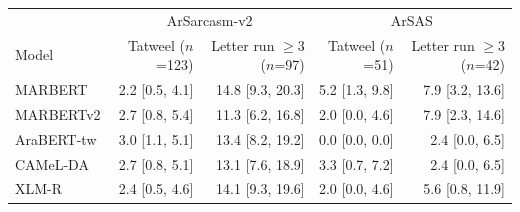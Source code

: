 \begin{tabular}{lrrrr}
\toprule
 & \multicolumn{2}{c}{ArSarcasm-v2} & \multicolumn{2}{c}{ArSAS} \\
Model & Tatweel {\scriptsize($n$=123)} & Letter run $\geq$3 {\scriptsize($n$=97)} & Tatweel {\scriptsize($n$=51)} & Letter run $\geq$3 {\scriptsize($n$=42)} \\
\midrule
MARBERT & 2.2 {\scriptsize[0.5, 4.1]} & 14.8 {\scriptsize[9.3, 20.3]} & 5.2 {\scriptsize[1.3, 9.8]} & 7.9 {\scriptsize[3.2, 13.6]} \\
MARBERTv2 & 2.7 {\scriptsize[0.8, 5.4]} & 11.3 {\scriptsize[6.2, 16.8]} & 2.0 {\scriptsize[0.0, 4.6]} & 7.9 {\scriptsize[2.3, 14.6]} \\
AraBERT-tw & 3.0 {\scriptsize[1.1, 5.1]} & 13.4 {\scriptsize[8.2, 19.2]} & 0.0 {\scriptsize[0.0, 0.0]} & 2.4 {\scriptsize[0.0, 6.5]} \\
CAMeL-DA & 2.7 {\scriptsize[0.8, 5.1]} & 13.1 {\scriptsize[7.6, 18.9]} & 3.3 {\scriptsize[0.7, 7.2]} & 2.4 {\scriptsize[0.0, 6.5]} \\
XLM-R & 2.4 {\scriptsize[0.5, 4.6]} & 14.1 {\scriptsize[9.3, 19.6]} & 2.0 {\scriptsize[0.0, 4.6]} & 5.6 {\scriptsize[0.8, 11.9]} \\
\bottomrule
\end{tabular}
